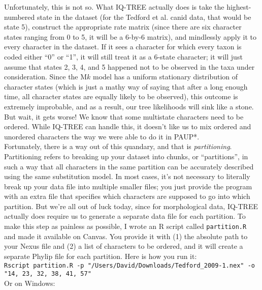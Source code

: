 \documentclass[12pt]{article}
\newcounter{code}
\begin{document}
\noindent Unfortunately, this is not so. What IQ-TREE actually does is take the highest-numbered state in the dataset (for the Tedford et al. canid data, that would be state 5), construct the appropriate rate matrix (since there are six character states ranging from 0 to 5, it will be a 6-by-6 matrix), and mindlessly apply it to every character in the dataset. If it sees a character for which every taxon is coded either ``0'' or ``1'', it will still treat it as a 6-state character; it will just assume that states 2, 3, 4, and 5 happened not to be observed in the taxa under consideration. Since the M$k$ model has a uniform stationary distribution of character states (which is just a mathy way of saying that after a long enough time, all character states are equally likely to be observed), this outcome is extremely improbable, and as a result, our tree likelihoods will sink like a stone. \\

\noindent But wait, it gets worse! We know that some multistate characters need to be ordered. While IQ-TREE can handle this, it doesn't like us to mix ordered and unordered characters the way we were able to do it in PAUP*. \\

\noindent Fortunately, there is a way out of this quandary, and that is \textit{partitioning}. Partitioning refers to breaking up your dataset into chunks, or ``partitions'', in such a way that all characters in the same partition can be accurately described using the same substitution model. In most cases, it's not necessary to literally break up your data file into multiple smaller files; you just provide the program with an extra file that specifies which characters are supposed to go into which partition. But we're all out of luck today, since for morphological data, IQ-TREE actually does require us to generate a separate data file for each partition. To make this step as painless as possible, I wrote an \textsf{R} script called \texttt{partition.R} and made it available on Canvas. You provide it with (1) the absolute path to your Nexus file and (2) a list of characters to be ordered, and it will create a separate Phylip file for each partition. Here is how you run it: \\

\texttt{Rscript partition.R -p "/Users/David/Downloads/Tedford\_2009-1.nex" -o "14, 23, 32, 38, 41, 57"} \\

Or on Windows: \\
\end{document}
